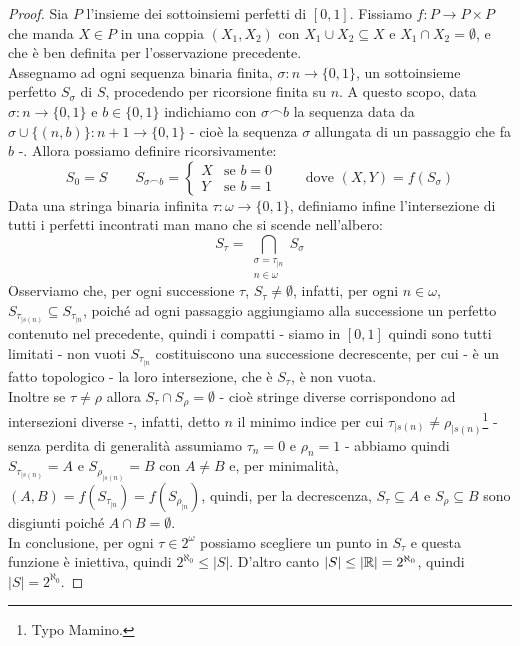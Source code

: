 \begin{proof}
	Sia $P$ l'insieme dei sottoinsiemi perfetti di $[0,1]$. Fissiamo $f : P \to P \times P$ che manda $X \in P$ in una coppia $(X_1,X_2)$ con $X_1 \cup X_2 \subseteq X$ e $X_1 \cap X_2 = \emptyset$, e che è ben definita per l'osservazione precedente.\\
	Assegnamo ad ogni sequenza binaria finita, $\sigma : n \to \{0,1\}$, un sottoinsieme perfetto $S_\sigma$ di $S$, procedendo per ricorsione finita su $n$. A questo scopo, data $\sigma : n \to \{0,1\}$ 
	e $b \in \{0,1\}$ indichiamo con $\sigma \frown b$ la sequenza data da $\sigma \cup \{(n,b)\} : n+1 \to \{0,1\}$ - cioè la sequenza $\sigma$ allungata di un passaggio che fa $b$ -. Allora possiamo definire ricorsivamente:
	\[ S_0 = S \qquad S_{\sigma \frown b} = \begin{cases}
		X &\text{se $b = 0$} \\
		Y &\text{se $b = 1$}
	\end{cases}
	\qquad \text{dove $(X,Y) = f(S_\sigma)$}
		\]
	Data una stringa binaria infinita $\tau : \omega \to \{0,1\}$, definiamo infine l'intersezione di tutti i perfetti incontrati man mano che si scende nell'albero:
	\[ S_\tau = \bigcap_{\substack{\sigma = \tau_{|n} \\ n \in \omega}} S_\sigma
		\]
	Osserviamo che, per ogni successione $\tau$, $S_\tau \ne \emptyset$, infatti, per ogni $n \in \omega$, $S_{\tau_{|s(n)}} \subseteq S_{\tau_{|n}}$, poiché ad ogni passaggio aggiungiamo alla successione un perfetto contenuto nel precedente,
	quindi i compatti - siamo in $[0,1]$ quindi sono tutti limitati - non vuoti $S_{\tau_{|n}}$ costituiscono una successione decrescente, per cui - è un fatto topologico - la loro intersezione, che è $S_{\tau}$, è non vuota.\\
	Inoltre se $\tau \ne \rho$ allora $S_\tau \cap S_\rho = \emptyset$ - cioè stringe diverse corrispondono ad intersezioni diverse -, infatti, detto $n$ il minimo indice per cui
	$\tau_{|s(n)} \ne \rho_{|s(n)}$\footnote{Typo Mamino.} - senza perdita di generalità assumiamo $\tau_n = 0$ e $\rho_n = 1$ - abbiamo quindi $S_{\tau_{|s(n)}} = A$ e $S_{\rho_{|s(n)}} = B$ con $A \ne B$ e, per minimalità, $(A,B) = f(S_{\tau_{|n}}) = f(S_{\rho_{|n}})$,
	quindi, per la decrescenza, $S_\tau \subseteq A$ e $S_\rho \subseteq B$ sono disgiunti poiché $A \cap B = \emptyset$.\\
	In conclusione, per ogni $\tau \in 2^\omega$ possiamo scegliere un punto in $S_\tau$ e questa funzione è 
	iniettiva, quindi $2^{\aleph_0} \leq |S|$. D'altro canto $|S| \leq |\mathbb R| = 2^{\aleph_0}$, quindi $|S| = 2^{\aleph_0}$.
\end{proof}

